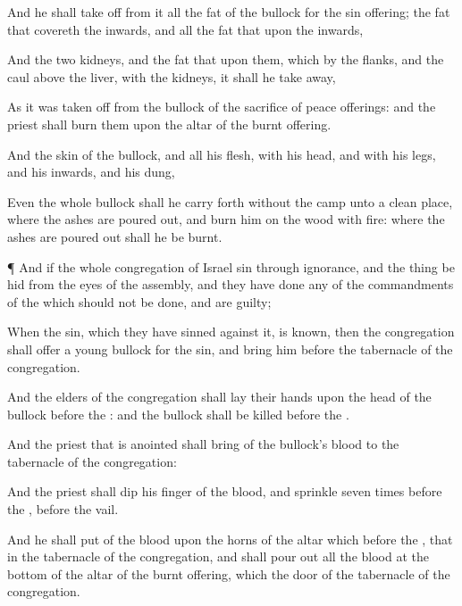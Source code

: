 {And he shall take
off from it all the
fat of the
bullock for the sin
offering; the
fat that
covereth the
inwards, and all the
fat that
{} upon the
inwards,

And the
two
kidneys, and the
fat that
{} upon them, which
{} by the
flanks, and the
caul above the
liver, with the
kidneys, it shall he take
away,

As it was taken
off from the
bullock of the
sacrifice of peace
offerings: and the
priest shall
burn them upon the
altar of the burnt
offering.

And the
skin of the
bullock, and all his
flesh, with his
head, and with his
legs, and his
inwards, and his
dung,

Even the whole
bullock shall he carry
forth
without the
camp unto a
clean
place, where the
ashes are poured
out, and
burn him on the
wood with
fire:
where the
ashes are poured
out shall he be
burnt.


\par }{\PP {}¶ And if the whole
congregation of
Israel sin through
ignorance, and the
thing be
hid from the
eyes of the
assembly, and they have
done
{}
any of the
commandments of the
{}
{} which should not be
done, and are
guilty;

When the
sin, which they have
sinned against it, is
known, then the
congregation shall
offer a
young
bullock for the
sin, and
bring him
before the
tabernacle of the
congregation.

And the
elders of the
congregation shall
lay their
hands upon the
head of the
bullock
before the
{}: and the
bullock shall be
killed
before the
{}.

And the
priest that is
anointed shall
bring of the
bullock’s
blood to the
tabernacle of the
congregation:

And the
priest shall
dip his
finger
{} of the
blood, and
sprinkle
{}
seven
times
before the
{},
{}
before the
vail.

And he shall
put
{} of the
blood upon the
horns of the
altar which
{}
before the
{}, that
{} in the
tabernacle of the
congregation, and shall pour
out all the
blood at the
bottom of the
altar of the burnt
offering, which
{} the
door of the
tabernacle of the
congregation.

}

